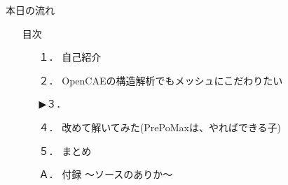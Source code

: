 \begin{frame}{本日の流れ}
  \begin{itemize}
      \item[] 目次
      \begin{itemize}[itemsep=1.3ex, leftmargin=1cm]
        \item[１．] 自己紹介
        \item[２．] OpenCAEの構造解析でもメッシュにこだわりたい
        \item[▶３．] 
        \item[４．] 改めて解いてみた(PrePoMaxは、やればできる子)
        \item[５．] まとめ
        \item[Ａ．] 付録 ～ソースのありか～
     \end{itemize}
  \end{itemize}
\end{frame}
